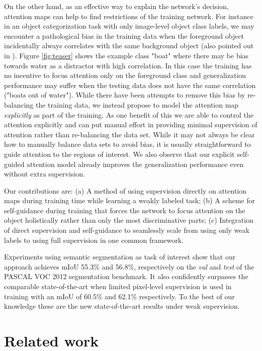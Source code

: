 \documentclass[10pt,twocolumn,letterpaper]{article}
\begin{document}
On the other hand, as an effective way to explain the network's decision, attention maps can help to find restrictions of the training network. For instance in an object categorization task with only image-level object class labels, we may encounter a pathological bias in the training data when the foreground object incidentally always correlates with the same background object (also pointed out in \cite{grad-cam}). Figure \ref{fig:teaser} shows the example class "boat" where there may be bias towards water as a distractor with high correlation. In this case the training has no incentive to focus attention only on the foreground class and generalization performance may suffer when the testing data does not have the same correlation ("boats out of water"). While there have been attempts to remove this bias by re-balancing the training data, we instead propose to model the attention map \emph{explicitly} as part of the training. As one benefit of this we are able to control the attention explicitly and can put manual effort in providing minimal supervision of attention rather than re-balancing the data set. While it may not always be clear how to manually balance data sets to avoid bias, it is usually straightforward to guide attention to the regions of interest. We also observe that our explicit self-guided attention model already improves the generalization performance even without extra supervision.

Our contributions are: (a) A method of using supervision directly on attention maps during training time while learning a weakly labeled task; (b) A scheme for self-guidance during training that forces the network to focus attention on the object holistically rather than only the most discriminative parts; (c) Integration of direct supervision and self-guidance to seamlessly scale from using only weak labels to using full supervision in one common framework.


Experiments using semantic segmentation as task of interest show that our approach achieves mIoU 55.3\% and 56.8\%, respectively on the \emph{val} and \emph{test} of the PASCAL VOC 2012 segmentation benchmark. It also confidently surpasses the comparable state-of-the-art when limited pixel-level supervision is used in training with an mIoU of 60.5\% and 62.1\% respectively. To the best of our knowledge these are the new state-of-the-art results under weak supervision.





\section{Related work}\label{sc:related_work}
\end{document}

